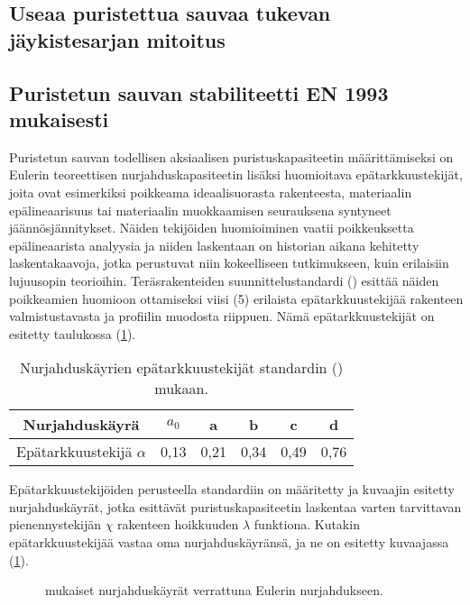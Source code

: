 \documentclass[12pt]{article}
\newenvironment{content}{\pagenumbering{arabic}}{}
\begin{document}
\begin{content}
\subsection{Useaa puristettua sauvaa tukevan jäykistesarjan mitoitus}




\subsection{Puristetun sauvan stabiliteetti EN 1993 mukaisesti}

Puristetun sauvan todellisen aksiaalisen puristuskapasiteetin määrittämiseksi on Eulerin teoreettisen nurjahduskapasiteetin lisäksi huomioitava epätarkkuustekijät, joita ovat esimerkiksi poikkeama ideaalisuorasta rakenteesta, materiaalin epälineaarisuus tai materiaalin muokkaamisen seurauksena syntyneet jäännösjännitykset. Näiden tekijöiden huomioiminen vaatii poikkeuksetta epälineaarista analyysia ja niiden laskentaan on historian aikana kehitetty laskentakaavoja, jotka perustuvat niin kokeelliseen tutkimukseen, kuin erilaisiin lujuusopin teorioihin.\parencite[27]{ziemian} Teräsrakenteiden suunnittelustandardi (\citeauthor{en1993}) esittää näiden poikkeamien huomioon ottamiseksi viisi (5) erilaista epätarkkuustekijää rakenteen valmistustavasta ja profiilin muodosta riippuen. Nämä epätarkkuustekijät on esitetty taulukossa (\ref{epätarkkuustekijät}). 

\begin{table}[htb]
\centering
\caption{Nurjahduskäyrien epätarkkuustekijät standardin (\citeauthor{en1993})  mukaan.}
\begin{tabular}{c c c c c c}
\label{epätarkkuustekijät}

Nurjahduskäyrä & $a_0$ & a & b & c & d \\
\hline
Epätarkkuustekijä $\alpha$ & 0,13 & 0,21 & 0,34 & 0,49 & 0,76
\end{tabular}
\end{table}

Epätarkkuustekijöiden perusteella standardiin on määritetty ja kuvaajin esitetty nurjahduskäyrät, jotka esittävät puristuskapasiteetin laskentaa varten tarvittavan pienennystekijän $\chi$ rakenteen hoikkuuden $\lambda$ funktiona. Kutakin epätarkkuustekijää vastaa oma nurjahduskäyränsä, ja ne on esitetty kuvaajassa (\ref{fig:nurjahduskäyräkuvaaja}). 

\begin{figure}[htb]

\caption{\citeauthor{en1993} mukaiset nurjahduskäyrät verrattuna Eulerin nurjahdukseen. }
\label{fig:nurjahduskäyräkuvaaja}
\end{figure}


\end{content}
\end{document}
